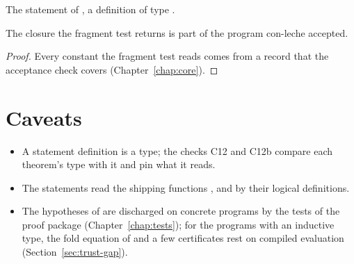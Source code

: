 \begin{definition}
  \label{def:EraseProof-collectDeps_sub-statement}
  \leanok
   The statement of , a definition of type .
\end{definition}

\begin{lemma}
  \label{lem:EraseProof-collectDeps_sub}
  \leanok
   The closure the fragment test returns is part of the program con-leche accepted.
\end{lemma}
\begin{proof}
  \leanok
   Every constant the fragment test reads comes from a record that the acceptance check covers (Chapter~\ref{chap:core}).
\end{proof}

\section*{Caveats}
\begin{itemize}
\item A statement definition is a type; the checks C12 and C12b compare each theorem's type with it and pin what it reads.
\item The statements read the shipping functions ,  and
   by their logical definitions.
\item The hypotheses of  are discharged on concrete programs by the tests of
  the proof package (Chapter~\ref{chap:tests}); for the programs with an inductive type, the fold equation of  and a few certificates rest on compiled evaluation
  (Section~\ref{sec:trust-gap}).
\end{itemize}
